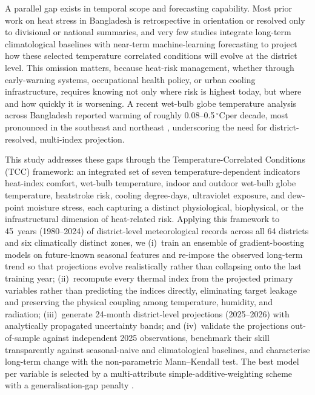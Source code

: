 \documentclass[review,11pt]{elsarticle}
\newcommand{\degC}{\ensuremath{^{\circ}\mathrm{C}}}
\begin{document}
A parallel gap exists in temporal scope and forecasting capability. Most prior
work on heat stress in Bangladesh is retrospective in orientation or resolved only
to divisional or national summaries, and very few studies integrate long-term
climatological baselines with near-term machine-learning forecasting to project
how these selected temperature correlated conditions will evolve at the district level. This omission matters,
because heat-risk management, whether through early-warning systems, occupational
health policy, or urban cooling infrastructure, requires knowing not only where
risk is highest today, but where and how quickly it is worsening. A recent
wet-bulb globe temperature analysis across Bangladesh reported warming of roughly
0.08--0.5\,\degC per decade, most pronounced in the southeast and northeast
\citep{kamal2024scientific}, underscoring the need for district-resolved, multi-index projection.

This study addresses these gaps through the Temperature-Correlated Conditions
(TCC) framework: an integrated set of seven temperature-dependent indicators
 heat-index comfort, wet-bulb temperature, indoor and outdoor wet-bulb globe
temperature, heatstroke risk, cooling degree-days, ultraviolet exposure, and
dew-point moisture stress, each capturing a distinct physiological, biophysical,
or the infrastructural dimension of heat-related risk. Applying this framework to
45~years (1980--2024) of district-level meteorological records across all
64 districts and six climatically distinct zones, we (i)~train an ensemble of
gradient-boosting models \citep{Breiman2001} on future-known seasonal features and
re-impose the observed long-term trend so that projections evolve realistically
rather than collapsing onto the last training year; (ii)~recompute every thermal
index from the projected primary variables rather than predicting the indices
directly, eliminating target leakage and preserving the physical coupling among
temperature, humidity, and radiation; (iii)~generate 24-month district-level
projections (2025--2026) with analytically propagated uncertainty bands; and
(iv)~validate the projections out-of-sample against independent 2025 observations,
benchmark their skill transparently against seasonal-naive and climatological
baselines, and characterise long-term change with the non-parametric
Mann--Kendall test. The best model per variable is selected by a multi-attribute
simple-additive-weighting scheme with a generalisation-gap penalty
\citep{Hwang1981}.
\end{document}
